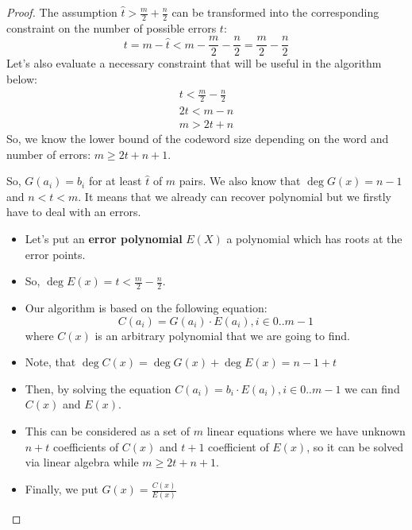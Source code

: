 \documentclass[../lecture-notes.tex]{subfiles}
\begin{document}
\begin{proof}
The assumption $\hat{t} > \frac{m}{2} + \frac{n}{2}$ can be transformed into the corresponding constraint on the number 
of possible errors $t$: 
\begin{equation*}
    t = m - \hat{t} < m - \frac{m}{2} - \frac{n}{2} = \frac{m}{2} - \frac{n}{2}
\end{equation*}
Let's also evaluate a necessary constraint that will be useful in the algorithm below:
\begin{gather*}
        t < \frac{m}{2} - \frac{n}{2}\\
        2t < m - n\\
        m > 2t+n
\end{gather*}
So, we know the lower bound of the codeword size depending on the word and number of errors: $m \geq 2t+n+1$.

\begin{tcolorbox}[title=Berlekamp-Welch decoding,
    breakable,
    colback=blue!5!white,
    colframe=blue!75!black,
    colbacktitle=blue!25!white,
    coltitle=blue!20!black,
    fonttitle=\bfseries,
    boxrule=1.25pt,
    subtitle style={boxrule=0pt,
    colback=blue!20!white,
    colupper=blue!75!gray} ]

    So, $G(a_i) = b_i$ for at least $\hat{t}$ of $m$ pairs. We also know that $\deg G(x) = n-1$ and $n < t < m$.
    It means that we already can recover polynomial but we firstly have to deal with an errors.

    
    \begin{itemize}[label=]
        \item Let's put an \textbf{error polynomial} $E(X)$ a polynomial which has roots at the error points.
        \item So, $\deg E(x) = t < \frac{m}{2} - \frac{n}{2}$.
        \item Our algorithm is based on the following equation: $$C(a_i) = G(a_i)\cdot E(a_i), i \in 0..m-1$$
        where $C(x)$ is an arbitrary polynomial that we are going to find.
        \item Note, that $\deg C(x) = \deg G(x) + \deg E(x) = n - 1 + t$
        \item Then, by solving the equation $C(a_i) = b_i\cdot E(a_i), i \in 0..m-1$ we can find $C(x)$ and $E(x)$.
        \item This can be considered as a set of $m$ linear equations where we have unknown $n+t$ coefficients
        of $C(x)$ and $t+1$ coefficient of $E(x)$, so it can be solved via linear algebra while $m \geq 2t+n+1$.
        \item Finally, we put $G(x) = \frac{C(x)}{E(x)}$
    \end{itemize}
    

\end{tcolorbox}
\end{proof}
\end{document}
